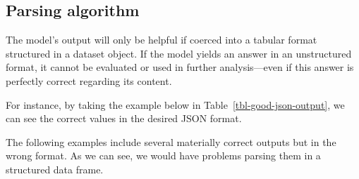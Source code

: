 \documentclass[
  12pt,
]{article}
\begin{document}
\subsection{Parsing algorithm}\label{parsing-algorithm}

The model's output will only be helpful if coerced into a tabular format
structured in a dataset object. If the model yields an answer in an
unstructured format, it cannot be evaluated or used in further
analysis---even if this answer is perfectly correct regarding its
content.

For instance, by taking the example below in
Table~\ref{tbl-good-json-output}, we can see the correct values in the
desired JSON format.

\begin{table}


\caption{\label{tbl-good-json-output}Example of correct output
(simplified version).}

\end{table}%

The following examples include several materially correct outputs but in
the wrong format. As we can see, we would have problems parsing them in
a structured data frame.

\begingroup\fontsize{9}{11}\selectfont
\end{document}
